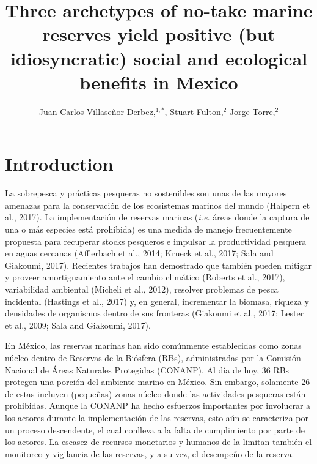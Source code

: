 \documentclass{frontiersSCNS}
\def\firstAuthorLast{Villasenor-Derbez {et~al.}}
\def\Authors{Juan Carlos Villaseñor-Derbez,\(^{1,*}\), Stuart Fulton,\(^{2}\) Jorge
Torre,\(^{2}\)}
\begin{document}
\onecolumn
{}

\title[Mexican marine reserves]{Three archetypes of no-take marine reserves yield positive (but
idiosyncratic) social and ecological benefits in Mexico} 

\author[\firstAuthorLast ]{\Authors} %
\address{} %
\correspondance{} %

\extraAuth{}

\maketitle



\section{Introduction}\label{introduction}

La sobrepesca y prácticas pesqueras no sostenibles son unas de las
mayores amenazas para la conservación de los ecosistemas marinos del
mundo \citep{halpern_2008-dK} (Halpern et al., 2017). La implementación
de reservas marinas (\emph{i.e.} áreas donde la captura de una o más
especies está prohibida) es una medida de manejo frecuentemente
propuesta para recuperar stocks pesqueros e impulsar la productividad
pesquera en aguas cercanas (Afflerbach et al., 2014; Krueck et al.,
2017; Sala and Giakoumi, 2017). Recientes trabajos han demostrado que
también pueden mitigar y proveer amortiguamiento ante el cambio
climático (Roberts et al., 2017), variabilidad ambiental (Micheli et
al., 2012), resolver problemas de pesca incidental (Hastings et al.,
2017) y, en general, incrementar la biomasa, riqueza y densidades de
organismos dentro de sus fronteras (Giakoumi et al., 2017; Lester et
al., 2009; Sala and Giakoumi, 2017).

En México, las reservas marinas han sido comúnmente establecidas como
zonas núcleo dentro de Reservas de la Biósfera (RBs), administradas por
la Comisión Nacional de Áreas Naturales Protegidas (CONANP). Al día de
hoy, 36 RBs protegen una porción del ambiente marino en México. Sin
embargo, solamente 26 de estas incluyen (pequeñas) zonas núcleo donde
las actividades pesqueras están prohibidas. Aunque la CONANP ha hecho
esfuerzos importantes por involucrar a los actores durante la
implementación de las reservas, esto aún se caracteriza por un proceso
descendente, el cual conlleva a la falta de cumplimiento por parte de
los actores. La escasez de recursos monetarios y humanos de la limitan
también el monitoreo y vigilancia de las reservas, y a su vez, el
desempeño de la reserva.
\end{document}
